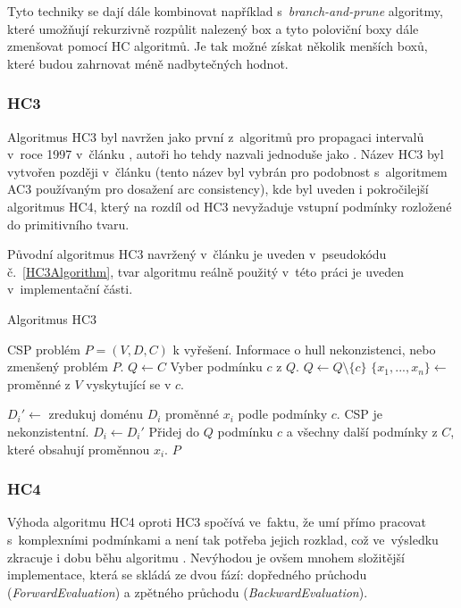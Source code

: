 Tyto techniky se dají dále kombinovat například s~\emph{branch-and-prune} algoritmy, které umožňují rekurzivně rozpůlit nalezený box a tyto poloviční boxy dále zmenšovat pomocí HC algoritmů. Je tak možné získat několik menších boxů, které budou zahrnovat méně nadbytečných hodnot.

\subsubsection{HC3}
Algoritmus HC3 byl navržen jako první z~algoritmů pro propagaci intervalů v~roce 1997 v~článku \cite{Benhamou97applyinginterval}, autoři ho tehdy nazvali jednoduše jako . Název HC3 byl vytvořen později v~článku \cite{Benhamou99revisinghull} (tento název byl vybrán pro podobnost s~algoritmem AC3 používaným pro dosažení arc consistency), kde byl uveden i pokročilejší algoritmus HC4, který na rozdíl od HC3 nevyžaduje vstupní podmínky rozložené do primitivního tvaru.
 
Původní algoritmus HC3 navržený v~článku \cite{Benhamou97applyinginterval} je uveden v~pseudokódu č.~\ref{HC3Algorithm}, tvar algoritmu reálně použitý v~této práci je uveden v~implementační části.

\begin{algorithm}
\caption{Algoritmus HC3}
\label{HC3Algorithm}
\begin{algorithmic}[1]
\Require CSP problém $P = (V, D, C)$ k vyřešení.
\Ensure Informace o hull nekonzistenci, nebo zmenšený problém $P$.
\State $Q \gets C$
\State Vyber podmínku $c$ z $Q$.
\State $Q \gets Q \setminus \{ c \}$
\State $\{ x_1, ..., x_n\} \gets $ proměnné z $V$ vyskytující se v $c$.

\State $D_i' \gets $ zredukuj doménu $D_i$ proměnné $x_i$ podle podmínky $c$.
\State \Return CSP je nekonzistentní.
\EndIf
{}
\State $D_i \gets D_i'$
\State Přidej do $Q$ podmínku $c$ a všechny další podmínky z $C$, které obsahují proměnnou $x_i$.
\EndIf
\EndFor
\EndWhile
\State \Return $P$
\EndProcedure
\end{algorithmic}
\end{algorithm}


\subsubsection{HC4}
Výhoda algoritmu HC4 oproti HC3 spočívá ve~faktu, že umí přímo pracovat s~komplexními podmínkami a není tak potřeba jejich rozklad, což ve~výsledku zkracuje i dobu běhu algoritmu \cite{Benhamou99revisinghull}. Nevýhodou je ovšem mnohem složitější implementace, která se skládá ze dvou fází: dopředného průchodu (\emph{ForwardEvaluation}) a zpětného průchodu (\emph{BackwardEvaluation}).

